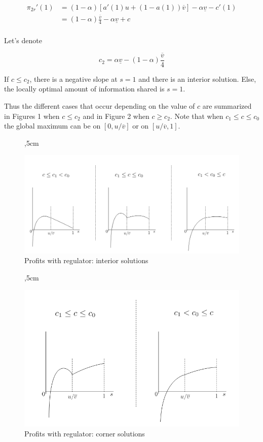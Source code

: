 \documentclass[a4paper,leqno]{article}%
\renewcommand{\a}{\alpha}
\newcommand{\uv}{\underline{v}}
\newcommand{\ov}{\overline{v}}
\begin{document}
\begin{equation}
    \begin{aligned}
\pi_{2r}'(1)&=(1-\a)[a'(1)u+(1-a(1))\ov] -\a\uv-c'(1)\\
            &=(1-\a)\frac{\ov}{4}-\a\uv+c\\
\end{aligned}
\end{equation}

Let's denote 

$$c_2=\a\uv-(1-\a)\frac{\ov}{4}$$

If $c\leq c_2$, there is a negative slope at $s=1$ and there is an interior solution. Else, the locally optimal amount of information shared is $s=1$.

\medskip

Thus the different cases that occur depending on the value of $c$ are summarized in Figures 1 when $c\leq c_2$ and in Figure 2 when $c\geq c_2$. Note that when $c_1\leq c\leq c_0$ the global maximum can be on $[0,u/\ov]$ or on $[u/\ov,1]$.

\medskip

\begin{figure}[H]
,5cm{
\includegraphics[scale=0.55]{Figure1}
\caption{Profits with regulator: interior solutions}\label{Figure1}}
\end{figure}


\begin{figure}[H]
,5cm{
\includegraphics[scale=0.55]{Figure2}
\caption{Profits with regulator: corner solutions}\label{Figure2}}
\end{figure}
\end{document}
